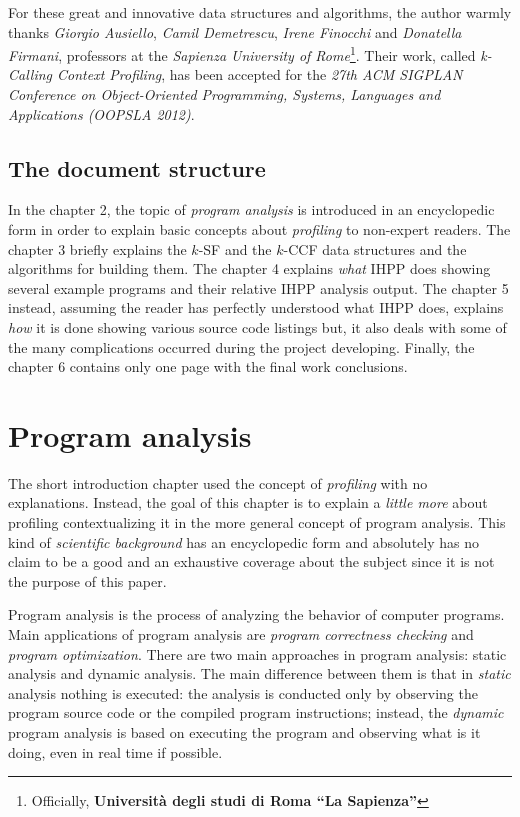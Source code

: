 \documentclass[a4paper,10pt]{report}
\begin{document}
For these great and innovative data structures and algorithms, the author warmly
thanks \emph{Giorgio Ausiello}, \emph{Camil Demetrescu}, \emph{Irene Finocchi}
and \emph{Donatella Firmani}, professors at the \emph{Sapienza University of
Rome}\footnote{Officially, \textbf{Universit\`a degli studi di Roma ``La
Sapienza''}}.
Their work, called \emph{\mbox{k-Calling} \mbox{Context} \mbox{Profiling}}, has
been accepted for the \emph{27th \mbox{ACM} \mbox{SIGPLAN} Conference on
Object-Oriented Programming, Systems, Languages and Applications (OOPSLA 2012)}.

\section{The document structure}
In the chapter 2, the topic of \emph{program analysis} is
introduced in an encyclopedic form in order to explain
basic concepts about \emph{profiling} to non-expert readers.
The chapter 3 briefly explains the $k$-SF and the $k$-CCF data structures
and the algorithms for building them. The chapter 4 explains \emph{what}
IHPP does showing several example programs and their relative IHPP analysis
output. The chapter 5 instead, assuming the reader has perfectly understood
what IHPP does, explains \emph{how} it is done showing various
source code listings but, it also deals with some of the many complications occurred
during the project developing. Finally, the chapter 6 contains only one
page with the final work conclusions.

\chapter{Program analysis}
The short introduction chapter used the concept of \emph{profiling} with
no explanations. Instead, the goal of this chapter is to explain a \emph{little more} about
profiling contextualizing it in the more general concept of program analysis.
This kind of \emph{scientific background} has an encyclopedic form and
absolutely has no claim to be a good and an exhaustive coverage about the
subject since it is not the purpose of this paper.

Program analysis is the process of analyzing the behavior of computer
programs. Main applications of program analysis are
\emph{program correctness checking} and \emph{program optimization}.
There are two main approaches in program analysis: static analysis and dynamic analysis.
The main difference between them is that in \emph{static} analysis nothing is
executed: the analysis is conducted only by observing the program source code or
the compiled program instructions; instead, the \emph{dynamic} program analysis
is based on executing the program and observing what is it doing, even in real
time if possible.
\end{document}
